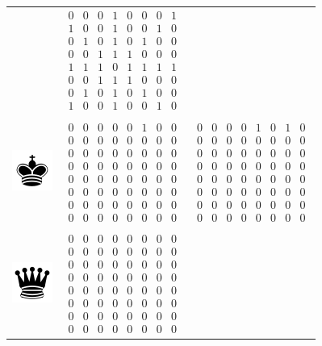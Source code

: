\documentclass[twocolumn]{phdsymp} %
\begin{document}
\begin{table}[]
\begin{tabular}{c c c}
&
$\begin{smallmatrix}0&0&0&1&0&0&0&1\\1&0&0&1&0&0&1&0\\0&1&0&1&0&1&0&0\\0&0&1&1&1&0&0&0\\1&1&1&0&1&1&1&1\\0&0&1&1&1&0&0&0\\0&1&0&1&0&1&0&0\\1&0&0&1&0&0&1&0\end{smallmatrix}$
\\&&\\
\includegraphics[scale=0.5]{pieces/k} &
$\begin{smallmatrix}0&0&0&0&0&1&0&0\\0&0&0&0&0&0&0&0\\0&0&0&0&0&0&0&0\\0&0&0&0&0&0&0&0\\0&0&0&0&0&0&0&0\\0&0&0&0&0&0&0&0\\0&0&0&0&0&0&0&0\\0&0&0&0&0&0&0&0\end{smallmatrix}$
 & 
$\begin{smallmatrix}0&0&0&0&1&0&1&0\\0&0&0&0&0&0&0&0\\0&0&0&0&0&0&0&0\\0&0&0&0&0&0&0&0\\0&0&0&0&0&0&0&0\\0&0&0&0&0&0&0&0\\0&0&0&0&0&0&0&0\\0&0&0&0&0&0&0&0\end{smallmatrix}$
\\&&\\ \includegraphics[scale=0.5]{pieces/q} &
$\begin{smallmatrix}0&0&0&0&0&0&0&0\\0&0&0&0&0&0&0&0\\0&0&0&0&0&0&0&0\\0&0&0&0&0&0&0&0\\0&0&0&0&0&0&0&0\\0&0&0&0&0&0&0&0\\0&0&0&0&0&0&0&0\\0&0&0&0&0&0&0&0\end{smallmatrix}$

\end{tabular}
\end{table}
\end{document}
